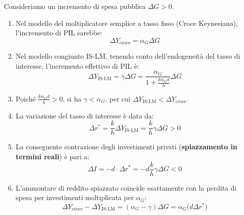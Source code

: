 \begin{dimostrazione}
Consideriamo un incremento di spesa pubblica $\Delta G > 0$.
\begin{enumerate}
    \item Nel modello del moltiplicatore semplice a tasso fisso (Croce Keynesiana), l'incremento di PIL sarebbe:
    \begin{equation}
        \Delta Y_{\text{croce}} = \alpha_G \Delta G
    \end{equation}
    \item Nel modello congiunto IS-LM, tenendo conto dell'endogeneità del tasso di interesse, l'incremento effettivo di PIL è:
    \begin{equation}
        \Delta Y_{\text{IS-LM}} = \gamma \Delta G = \frac{\alpha_G}{1 + \frac{k \alpha_G d}{h}} \Delta G
    \end{equation}
    \item Poiché $\frac{k \alpha_G d}{h} > 0$, si ha $\gamma < \alpha_G$, per cui $\Delta Y_{\text{IS-LM}} < \Delta Y_{\text{croce}}$.
    \item La variazione del tasso di interesse è data da:
    \begin{equation}
        \Delta r^* = \frac{k}{h} \Delta Y_{\text{IS-LM}} = \frac{k}{h} \gamma \Delta G > 0
    \end{equation}
    \item La conseguente contrazione degli investimenti privati (\textbf{spiazzamento in termini reali}) è pari a:
    \begin{equation}
        \Delta I = -d \cdot \Delta r^* = -d \frac{k}{h} \gamma \Delta G < 0
    \end{equation}
    \item L'ammontare di reddito spiazzato coincide esattamente con la perdita di spesa per investimenti moltiplicata per $\alpha_G$:
    \begin{equation}
        \Delta Y_{\text{croce}} - \Delta Y_{\text{IS-LM}} = (\alpha_G - \gamma) \Delta G = \alpha_G \big( d \Delta r^* \big)
    \end{equation}
\end{enumerate}
\end{dimostrazione}

